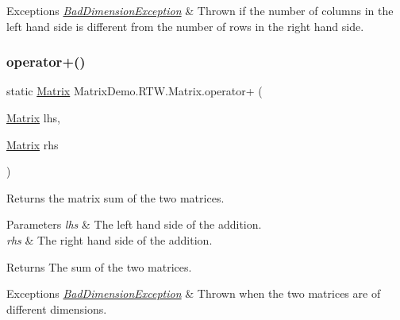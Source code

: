 \begin{DoxyExceptions}{Exceptions}
{\em \mbox{\hyperlink{class_matrix_demo_1_1_r_t_w_1_1_bad_dimension_exception}{Bad\+Dimension\+Exception}}} & Thrown if the number of columns in the left hand side is different from the number of rows in the right hand side.\\
\hline
\end{DoxyExceptions}
\mbox{\label{class_matrix_demo_1_1_r_t_w_1_1_matrix_a6c0787446dfff85088742793f129729a}} 
\subsubsection{\texorpdfstring{operator+()}{operator+()}}
{\footnotesize\ttfamily static \mbox{\hyperlink{class_matrix_demo_1_1_r_t_w_1_1_matrix}{Matrix}} Matrix\+Demo.\+R\+T\+W.\+Matrix.\+operator+ (\begin{DoxyParamCaption}\item[{\mbox{\hyperlink{class_matrix_demo_1_1_r_t_w_1_1_matrix}{Matrix}}}]{lhs,  }\item[{\mbox{\hyperlink{class_matrix_demo_1_1_r_t_w_1_1_matrix}{Matrix}}}]{rhs }\end{DoxyParamCaption})\hspace{0.3cm}{\ttfamily [static]}}



Returns the matrix sum of the two matrices. 


\begin{DoxyParams}{Parameters}
{\em lhs} & The left hand side of the addition.\\
\hline
{\em rhs} & The right hand side of the addition.\\
\hline
\end{DoxyParams}
\begin{DoxyReturn}{Returns}
The sum of the two matrices.
\end{DoxyReturn}

\begin{DoxyExceptions}{Exceptions}
{\em \mbox{\hyperlink{class_matrix_demo_1_1_r_t_w_1_1_bad_dimension_exception}{Bad\+Dimension\+Exception}}} & Thrown when the two matrices are of different dimensions.\\
\hline
\end{DoxyExceptions}
\mbox{\label{class_matrix_demo_1_1_r_t_w_1_1_matrix_a7d96c0cc84a8ae412014464007fbb576}} 

